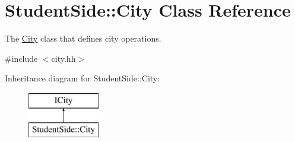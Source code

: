 \hypertarget{class_student_side_1_1_city}{\section{Student\-Side\-:\-:City Class Reference}
\label{class_student_side_1_1_city}
}


The \hyperlink{class_student_side_1_1_city}{City} class that defines city operations.  




{\ttfamily \#include $<$city.\-hh$>$}

Inheritance diagram for Student\-Side\-:\-:City\-:\begin{figure}[H]
\begin{center}
\leavevmode
\includegraphics[height=2.000000cm]{class_student_side_1_1_city}
\end{center}
\end{figure}
